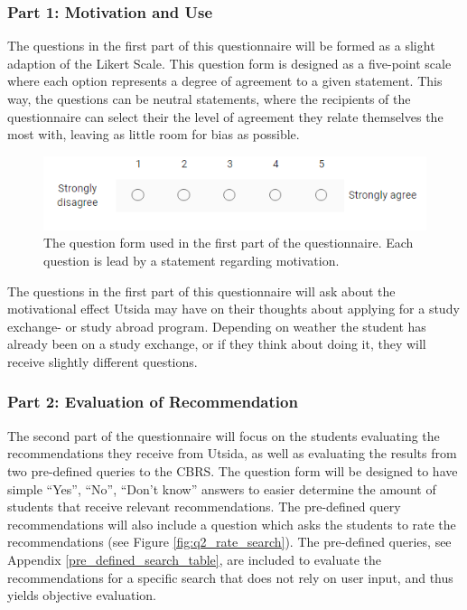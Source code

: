 
\subsubsection{Part 1: Motivation and Use}
The questions in the first part of this questionnaire will be formed as a slight adaption of the Likert Scale\cite{likert1932technique}. This question form is designed as a five-point scale where each option represents a degree of agreement to a given statement. This way, the questions can be neutral statements, where the recipients of the questionnaire can select their the level of agreement they relate themselves the most with, leaving as little room for bias as possible. 

\begin{figure}[H]
    \centering
    \includegraphics[width=1\textwidth]{fig/q2_question_form.PNG}
    \caption{The question form used in the first part of the questionnaire. Each question is lead by a statement regarding motivation.}
    \label{fig:q2_question_form}
\end{figure}

The questions in the first part of this questionnaire will ask about the motivational effect Utsida may have on their thoughts about applying for a study exchange- or study abroad program. Depending on weather the student has already been on a study exchange, or if they think about doing it, they will receive slightly different questions.

\subsubsection{Part 2: Evaluation of Recommendation}

The second part of the questionnaire will focus on the students evaluating the recommendations they receive from Utsida, as well as evaluating the results from two pre-defined queries to the CBRS. The question form will be designed to have simple \enquote{Yes}, \enquote{No}, \enquote{Don't know} answers to easier determine the amount of students that receive relevant recommendations. The pre-defined query recommendations will also include a question which asks the students to rate the recommendations (see Figure \ref{fig:q2_rate_search}). The pre-defined queries, see Appendix \ref{pre_defined_search_table}, are included to evaluate the recommendations for a specific search that does not rely on user input, and thus yields objective evaluation. 

